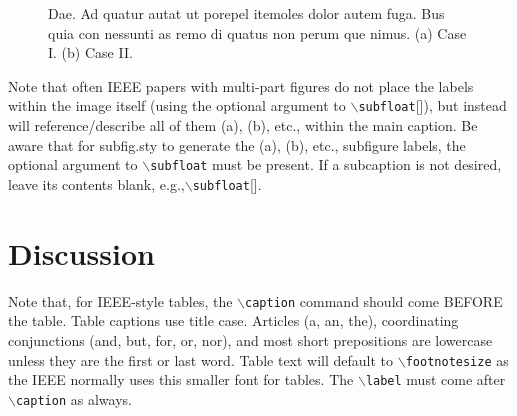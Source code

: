 \documentclass[lettersize,journal]{IEEEtran}
\begin{document}
	
	\begin{figure}[!t]
		\centering
		\hfil
		\caption{Dae. Ad quatur autat ut porepel itemoles dolor autem fuga. Bus quia con nessunti as remo di quatus non perum que nimus. (a) Case I. (b) Case II.}
		
	\end{figure}
	
	Note that often IEEE papers with multi-part figures do not place the labels within the image itself (using the optional argument to $\backslash${\tt{subfloat}}[]), but instead will
	reference/describe all of them (a), (b), etc., within the main caption.
	Be aware that for subfig.sty to generate the (a), (b), etc., subfigure
	labels, the optional argument to $\backslash${\tt{subfloat}} must be present. If a
	subcaption is not desired, leave its contents blank,
	e.g.,$\backslash${\tt{subfloat}}[].
	
	
	
	
	\section{Discussion}
	Note that, for IEEE-style tables, the
	$\backslash${\tt{caption}} command should come BEFORE the table. Table captions use title case. Articles (a, an, the), coordinating conjunctions (and, but, for, or, nor), and most short prepositions are lowercase unless they are the first or last word. Table text will default to $\backslash${\tt{footnotesize}} as
	the IEEE normally uses this smaller font for tables.
	The $\backslash${\tt{label}} must come after $\backslash${\tt{caption}} as always.
	
\end{document}
